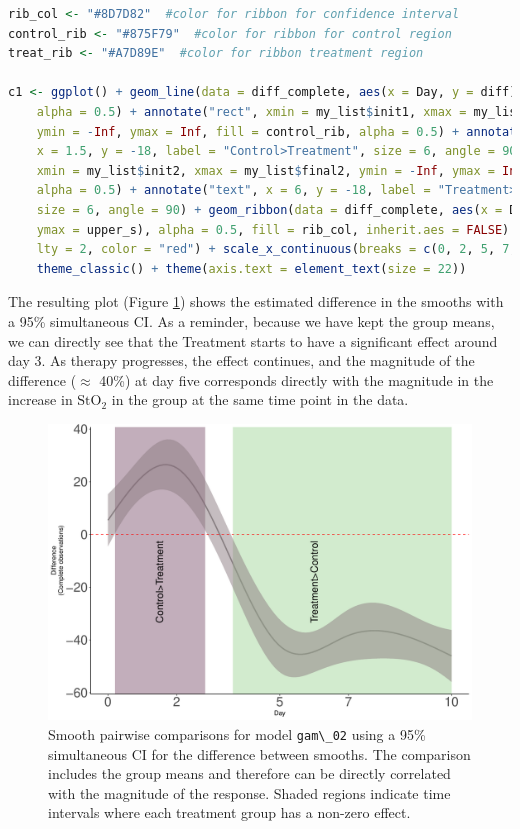 \documentclass[
]{article}
\newcommand{\passthrough}[1]{#1}
\begin{document}
\begin{lstlisting}[language=R]
rib_col <- "#8D7D82"  #color for ribbon for confidence interval
control_rib <- "#875F79"  #color for ribbon for control region
treat_rib <- "#A7D89E"  #color for ribbon treatment region

c1 <- ggplot() + geom_line(data = diff_complete, aes(x = Day, y = diff), size = 1,
    alpha = 0.5) + annotate("rect", xmin = my_list$init1, xmax = my_list$final1,
    ymin = -Inf, ymax = Inf, fill = control_rib, alpha = 0.5) + annotate("text",
    x = 1.5, y = -18, label = "Control>Treatment", size = 6, angle = 90) + annotate("rect",
    xmin = my_list$init2, xmax = my_list$final2, ymin = -Inf, ymax = Inf, fill = treat_rib,
    alpha = 0.5) + annotate("text", x = 6, y = -18, label = "Treatment>Control",
    size = 6, angle = 90) + geom_ribbon(data = diff_complete, aes(x = Day, ymin = lower_s,
    ymax = upper_s), alpha = 0.5, fill = rib_col, inherit.aes = FALSE) + geom_hline(yintercept = 0,
    lty = 2, color = "red") + scale_x_continuous(breaks = c(0, 2, 5, 7, 10)) + labs(y = "Difference\n(Complete observations)") +
    theme_classic() + theme(axis.text = element_text(size = 22))
\end{lstlisting}

The resulting plot (Figure \ref{fig:pairwise-comp-workflow-fig}) shows the estimated difference in the smooths with a 95\% simultaneous CI. As a reminder, because we have kept the group means, we can directly see that the Treatment starts to have a significant effect around day 3. As therapy progresses, the effect continues, and the magnitude of the difference (\(\approx\) 40\%) at day five corresponds directly with the magnitude in the increase in \(\mbox{StO}_2\) in the group at the same time point in the data.



\begin{figure}

{\centering \includegraphics[width=0.75\linewidth]{Appendix_A_files/figure-latex/pairwise-comp-workflow-fig-1} 

}

\caption{Smooth pairwise comparisons for model \passthrough{\lstinline!gam\_02!} using a 95\% simultaneous CI for the difference between smooths. The comparison includes the group means and therefore can be directly correlated with the magnitude of the response. Shaded regions indicate time intervals where each treatment group has a non-zero effect.}\label{fig:pairwise-comp-workflow-fig}
\end{figure}
 \FloatBarrier
\end{document}
